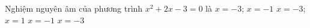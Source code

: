 

\begin{ex}%
	Nghiệm nguyên âm của phương trình $x^2+2x-3=0$  là
	 \choice
		{$x=-3$;  $x=-1$}
		{$x=-3$;  $x=1$}
		{$x=-1$} 
		 {\True $x=-3$}
\end{ex}



